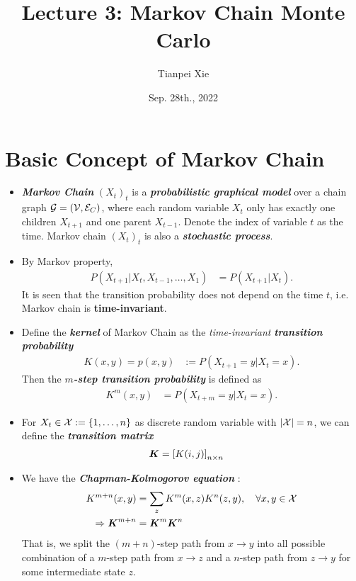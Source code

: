 \documentclass[11pt]{article}
\begin{document}
\title{Lecture 3: Markov Chain Monte Carlo}
\author{ Tianpei Xie}
\date{Sep. 28th., 2022 }
\maketitle
\tableofcontents
\newpage
\allowdisplaybreaks
\section{Basic Concept of Markov Chain}
\begin{itemize}
\item \emph{\textbf{Markov Chain}} $(X_t)_t$ is a \emph{\textbf{probabilistic graphical model}} over a chain graph ${\mathcal G}=({\mathcal V}, {\mathcal E}_{C})$, where each random variable $X_t$ only has exactly one children $X_{t+1}$ and one parent $X_{t-1}$. Denote the index of variable $t$ as the time. Markov chain  $(X_t)_t$ is also a \emph{\textbf{stochastic process}}. 

\item By Markov property, 
\begin{align*}
P(X_{t+1} | X_t, X_{t-1}, \ldots, X_1) &= P(X_{t+1} | X_t) .
\end{align*} It is seen that the transition probability does not depend on the time $t$, i.e. Markov chain is \textbf{time-invariant}.

\item Define the \emph{\textbf{kernel}} of Markov Chain as the \emph{time-invariant} \emph{\textbf{transition probability}}
\begin{align}
K(x, y)  = p(x, y) &:= P(X_{t+1} = y | X_t = x).  \label{eqn: mc_kernel}
\end{align} Then the \emph{\textbf{$m$-step transition probability}} is defined as
\begin{align}
K^{m}(x, y) &= P(X_{t+m} = y | X_t = x). \label{eqn: mc_kernel_m}
\end{align}

\item For $X_t \in {\mathcal X}:= \left\{1, \ldots, n\right\}$ as discrete random variable with $\left\lvert {\mathcal X} \right\rvert = n$, we can define the \textbf{\emph{transition matrix}}
\begin{align}
\boldsymbol{K} &= \left[K(i,j)\right]_{n\times n} \label{eqn: mc_kernel_mat}
\end{align}

\item We have the \emph{\textbf{Chapman-Kolmogorov equation}} \citep{ross2014introduction}:
\begin{align}
K^{m+n}(x, y)  &= \sum_{z}K^{m}(x, z)K^{n}(z, y), \quad \forall x,y \in {\mathcal X} \label{eqn: mc_ck_eqn}\\
\Rightarrow \boldsymbol{K}^{m+n} &= \boldsymbol{K}^{m}\boldsymbol{K}^{n} \nonumber
\end{align} That is, we split the  $(m+n)$-step path from $x\rightarrow y$ into all possible combination of a $m$-step path from $x\rightarrow z$ and a $n$-step path from $z \rightarrow y$ for some intermediate state $z$.



\end{itemize}
\end{document}
